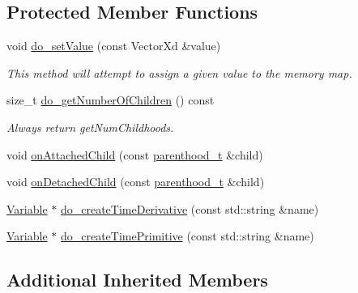 \subsection*{Protected Member Functions}
\begin{DoxyCompactItemize}
\item 
void \hyperlink{classocra_1_1CompositeVariable_aa2d9ca737bf529e2686ba9a3ee1126e5}{do\+\_\+set\+Value} (const Vector\+Xd \&value)
\begin{DoxyCompactList}\small\item\em This method will attempt to assign a given value to the memory map. \end{DoxyCompactList}\item 
size\+\_\+t \hyperlink{classocra_1_1CompositeVariable_a7e5300900a35056b1fcea87b63dfa079}{do\+\_\+get\+Number\+Of\+Children} () const 
\begin{DoxyCompactList}\small\item\em Always return get\+Num\+Childhoods. \end{DoxyCompactList}\end{DoxyCompactItemize}
{\bf }\par
\begin{DoxyCompactItemize}
\item 
void \hyperlink{classocra_1_1CompositeVariable_a995a870aa6b0a9933ebffd975ce6f6a5}{on\+Attached\+Child} (const \hyperlink{classocra_1_1Variable_a88444b2124cf5aab069f46734822f31f}{parenthood\+\_\+t} \&child)
\item 
void \hyperlink{classocra_1_1CompositeVariable_a76b21bf2425a09aded03b3d7a22c8db8}{on\+Detached\+Child} (const \hyperlink{classocra_1_1Variable_a88444b2124cf5aab069f46734822f31f}{parenthood\+\_\+t} \&child)
\end{DoxyCompactItemize}

{\bf }\par
\begin{DoxyCompactItemize}
\item 
\hyperlink{classocra_1_1Variable}{Variable} $\ast$ \hyperlink{classocra_1_1CompositeVariable_a4ac0f033cea1cb5e4bfdb414765c3743}{do\+\_\+create\+Time\+Derivative} (const std\+::string \&name)
\item 
\hyperlink{classocra_1_1Variable}{Variable} $\ast$ \hyperlink{classocra_1_1CompositeVariable_a09fb82df36205326b995aca1dd8f14ba}{do\+\_\+create\+Time\+Primitive} (const std\+::string \&name)
\end{DoxyCompactItemize}

\subsection*{Additional Inherited Members}


